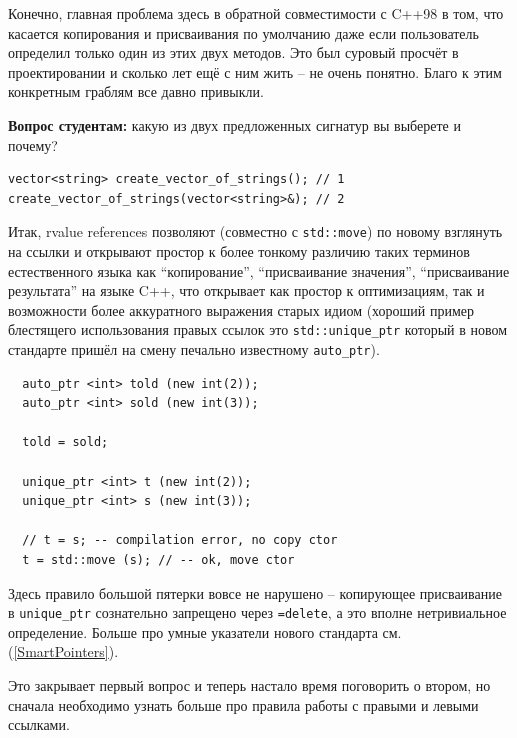 \documentclass[a4paper,12pt,oneside]{article}
\newif\ifanswers
\begin{document}
Конечно, главная проблема здесь в обратной совместимости с C++98 в том, что касается копирования и присваивания по умолчанию даже если пользователь определил только один из этих двух методов. Это был суровый просчёт в проектировании и сколько лет ещё с ним жить -- не очень понятно. Благо к этим конкретным граблям все давно привыкли.

\textbf{Вопрос студентам:} какую из двух предложенных сигнатур вы выберете и почему?

\begin{lstlisting}
vector<string> create_vector_of_strings(); // 1
create_vector_of_strings(vector<string>&); // 2
\end{lstlisting}

\ifanswers
Правильный ответ: их более одного. Всё изложение подталкивает к ответу (1), но тут возможен спор. В любом случае этот спор нужно вести с учётом конструкторов перемещения. Аргументировать (2) тут гораздо сложнее, но на практике-то все пишут именно так.
\fi

Итак, rvalue references позволяют (совместно с \lstinline!std::move!) по новому взглянуть на ссылки и открывают простор к более тонкому различию таких терминов естественного языка как ``копирование'', ``присваивание значения'', ``присваивание результата'' на языке C++, что открывает как простор к оптимизациям, так и возможности более аккуратного выражения старых идиом (хороший пример блестящего использования правых ссылок это \lstinline!std::unique_ptr! который в новом стандарте пришёл на смену печально известному \lstinline!auto_ptr!). 

\begin{lstlisting}
  auto_ptr <int> told (new int(2));
  auto_ptr <int> sold (new int(3));

  told = sold;

  unique_ptr <int> t (new int(2));
  unique_ptr <int> s (new int(3));

  // t = s; -- compilation error, no copy ctor
  t = std::move (s); // -- ok, move ctor
\end{lstlisting}

Здесь правило большой пятерки вовсе не нарушено -- копирующее присваивание в \lstinline!unique_ptr! сознательно запрещено через \lstinline!=delete!, а это вполне нетривиальное определение. Больше про умные указатели нового стандарта см. (\ref{SmartPointers}).

Это закрывает первый вопрос и теперь настало время поговорить о втором, но сначала необходимо узнать больше про правила работы с правыми и левыми ссылками.
\end{document}
